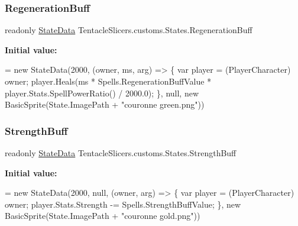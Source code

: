 \subsubsection{\texorpdfstring{Regeneration\+Buff}{RegenerationBuff}}
{\footnotesize\ttfamily readonly \hyperlink{class_tentacle_slicers_1_1states_1_1_state_data}{State\+Data} Tentacle\+Slicers.\+customs.\+States.\+Regeneration\+Buff\hspace{0.3cm}{\ttfamily [static]}}

{\bfseries Initial value\+:}
\begin{DoxyCode}
= \textcolor{keyword}{new} StateData(2000, (owner, ms, arg) =>
        \{
            var player = (PlayerCharacter) owner;
            player.Heals(ms * Spells.RegenerationBuffValue * player.Stats.SpellPowerRatio() / 2000.0);
        \}, null, \textcolor{keyword}{new} BasicSprite(State.ImagePath + \textcolor{stringliteral}{"couronne green.png"}))
\end{DoxyCode}
\mbox{\label{class_tentacle_slicers_1_1customs_1_1_states_a5ad923973f0e1d63850f21e192c34098}} 
\subsubsection{\texorpdfstring{Strength\+Buff}{StrengthBuff}}
{\footnotesize\ttfamily readonly \hyperlink{class_tentacle_slicers_1_1states_1_1_state_data}{State\+Data} Tentacle\+Slicers.\+customs.\+States.\+Strength\+Buff\hspace{0.3cm}{\ttfamily [static]}}

{\bfseries Initial value\+:}
\begin{DoxyCode}
= \textcolor{keyword}{new} StateData(2000, null, (owner, arg) =>
        \{
            var player = (PlayerCharacter) owner;
            player.Stats.Strength -= Spells.StrengthBuffValue;
        \}, \textcolor{keyword}{new} BasicSprite(State.ImagePath + \textcolor{stringliteral}{"couronne gold.png"}))
\end{DoxyCode}
\mbox{\label{class_tentacle_slicers_1_1customs_1_1_states_a01fb88256c5edb1fbadb7e0466bab8c2}} 
